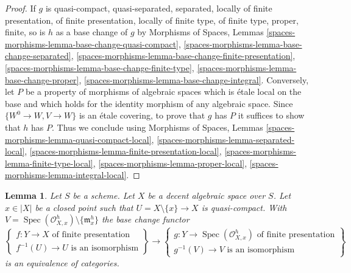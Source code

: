 \documentclass{stacks-project}
\theoremstyle{plain}
\newtheorem{lemma}[subsection]{Lemma}
\theoremstyle{definition}
\theoremstyle{remark}
\numberwithin{equation}{subsection}
\def\Spec{\mathop{\mathrm{Spec}}}
\begin{document}
\begin{proof}
If $g$ is quasi-compact, quasi-separated, separated, locally of finite
presentation, of finite presentation, locally of finite type, of finite type,
proper, finite, so is $h$ as a base change of $g$ by
Morphisms of Spaces, Lemmas
\ref{spaces-morphisms-lemma-base-change-quasi-compact},
\ref{spaces-morphisms-lemma-base-change-separated},
\ref{spaces-morphisms-lemma-base-change-finite-presentation},
\ref{spaces-morphisms-lemma-base-change-finite-type},
\ref{spaces-morphisms-lemma-base-change-proper},
\ref{spaces-morphisms-lemma-base-change-integral}.
Conversely, let $P$ be a property of morphisms of algebraic
spaces which is \'etale local on the base and which holds for
the identity morphism of any algebraic space.
Since $\{W^0 \to W, V \to W\}$ is an \'etale
covering, to prove that $g$ has $P$ it suffices to show
that $h$ has $P$. Thus we conclude using
Morphisms of Spaces, Lemmas
\ref{spaces-morphisms-lemma-quasi-compact-local},
\ref{spaces-morphisms-lemma-separated-local},
\ref{spaces-morphisms-lemma-finite-presentation-local},
\ref{spaces-morphisms-lemma-finite-type-local},
\ref{spaces-morphisms-lemma-proper-local},
\ref{spaces-morphisms-lemma-integral-local}.
\end{proof}

\begin{lemma}
\label{lemma-modifications}
Let $S$ be a scheme. Let $X$ be a decent algebraic space over $S$.
Let $x \in |X|$ be a closed point such that $U = X \setminus \{x\} \to X$
is quasi-compact. With
$V = \Spec(\mathcal{O}_{X, x}^h) \setminus \{\mathfrak m_x^h\}$
the base change functor
$$
\left\{
\begin{matrix}
f : Y \to X\text{ of finite presentation} \\
f^{-1}(U) \to U\text{ is an isomorphism}
\end{matrix}
\right\}
\longrightarrow
\left\{
\begin{matrix}
g : Y \to \Spec(\mathcal{O}_{X, x}^h)\text{ of finite presentation} \\
g^{-1}(V) \to V\text{ is an isomorphism}
\end{matrix}
\right\}
$$
is an equivalence of categories.
\end{lemma}
\end{document}
